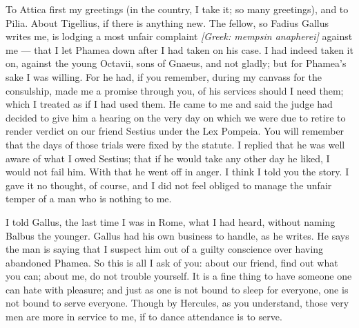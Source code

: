 

 To Attica first my greetings (in the country, I take it; so many greetings), and to Pilia. About Tigellius, if there is anything new. The fellow, so Fadius Gallus writes me, is lodging a most unfair complaint \textit{[Greek: mempsin anapherei]} against me --- that I let Phamea down after I had taken on his case. I had indeed taken it on, against the young Octavii, sons of Gnaeus, and not gladly; but for Phamea's sake I was willing. For he had, if you remember, during my canvass for the consulship, made me a promise through you, of his services should I need them; which I treated as if I had used them. He came to me and said the judge had decided to give him a hearing on the very day on which we were due to retire to render verdict on our friend Sestius under the Lex Pompeia. You will remember that the days of those trials were fixed by the statute. I replied that he was well aware of what I owed Sestius; that if he would take any other day he liked, I would not fail him. With that he went off in anger. I think I told you the story. I gave it no thought, of course, and I did not feel obliged to manage the unfair temper of a man who is nothing to me.

 I told Gallus, the last time I was in Rome, what I had heard, without naming Balbus the younger. Gallus had his own business to handle, as he writes. He says the man is saying that I suspect him out of a guilty conscience over having abandoned Phamea. So this is all I ask of you: about our friend, find out what you can; about me, do not trouble yourself. It is a fine thing to have someone one can hate with pleasure; and just as one is not bound to sleep for everyone, one is not bound to serve everyone. Though by Hercules, as you understand, those very men are more in service to me, if to dance attendance is to serve.
